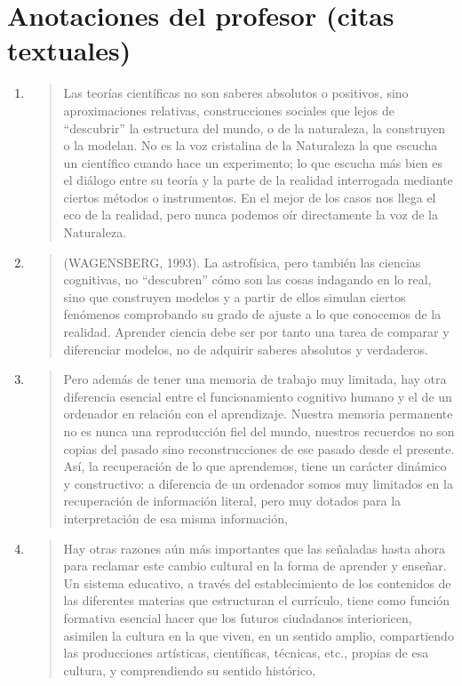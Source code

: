 \documentclass{article}
\begin{document}
\section{Anotaciones del profesor (citas textuales)}
\begin{enumerate}[label=\textbf{A\arabic*.}, leftmargin=*, itemsep=10pt]

  \item \begin{quote}
Las teorías científicas no son saberes absolutos o positivos, sino aproximaciones relativas, construcciones sociales que lejos de “descubrir” la estructura del mundo, o de la naturaleza, la construyen o la modelan. No es la voz cristalina de la Naturaleza la que escucha un científico cuando hace un experimento; lo que escucha más bien es el diálogo entre su teoría y la parte de la realidad interrogada mediante ciertos métodos o instrumentos. En el mejor de los casos nos llega el eco de la realidad, pero nunca podemos oír directamente la voz de la Naturaleza.
  \end{quote}

  \item \begin{quote}
(WAGENSBERG, 1993). La astrofísica, pero también las ciencias cognitivas, no “descubren” cómo son las cosas indagando en lo real, sino que construyen modelos y a partir de ellos simulan ciertos fenómenos comprobando su grado de ajuste a lo que conocemos de la realidad. Aprender ciencia debe ser por tanto una tarea de comparar y diferenciar modelos, no de adquirir saberes absolutos y verdaderos.
  \end{quote}

  \item \begin{quote}
Pero además de tener una memoria de trabajo muy limitada, hay otra diferencia esencial entre el funcionamiento cognitivo humano y el de un ordenador en relación con el aprendizaje. Nuestra memoria permanente no es nunca una reproducción fiel del mundo, nuestros recuerdos no son copias del pasado sino reconstrucciones de ese pasado desde el presente. Así, la recuperación de lo que aprendemos, tiene un carácter dinámico y constructivo: a diferencia de un ordenador somos muy limitados en la recuperación de información literal, pero muy dotados para la interpretación de esa misma información,
  \end{quote}

  \item \begin{quote}
Hay otras razones aún más importantes que las señaladas hasta ahora para reclamar este cambio cultural en la forma de aprender y enseñar. Un sistema educativo, a través del establecimiento de los contenidos de las diferentes materias que estructuran el currículo, tiene como función formativa esencial hacer que los futuros ciudadanos interioricen, asimilen la cultura en la que viven, en un sentido amplio, compartiendo las producciones artísticas, científicas, técnicas, etc., propias de esa cultura, y comprendiendo su sentido histórico,
  \end{quote}


\end{enumerate}
\end{document}
